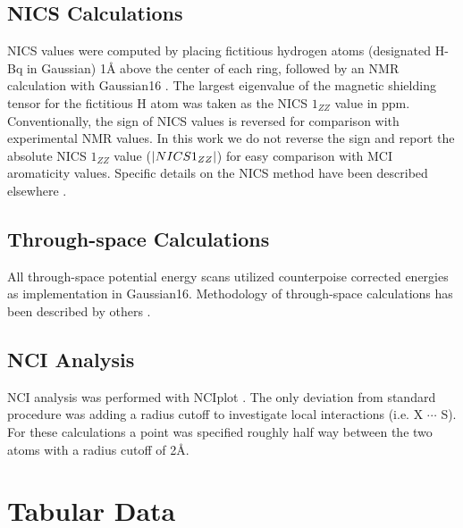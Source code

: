\subsection{NICS Calculations}
NICS values were computed by placing fictitious hydrogen atoms (designated H-Bq in Gaussian) 1\si{\angstrom} above the center of each ring, followed by an NMR calculation with Gaussian16 \cite{g16}. The largest eigenvalue of the magnetic shielding tensor for the fictitious H atom was taken as the NICS $1_{ZZ}$ value in ppm. Conventionally, the sign of NICS values is reversed for comparison with experimental NMR values. In this work we do not reverse the sign and report the absolute NICS $1_{ZZ}$ value ($\abs*{NICS 1_{ZZ}}$) for easy comparison with MCI aromaticity values. Specific details on the NICS method have been described elsewhere \cite{Fallah-Bagher-Shaidaei2006, Chen2005}.

\subsection{Through-space Calculations}
All through-space potential energy scans utilized counterpoise corrected energies as implementation in Gaussian16. Methodology of through-space calculations has been described by others \cite{Jackson2013}.

\subsection{NCI Analysis}
NCI analysis was performed with NCIplot \cite{Johnson2010, Contreras-Garcia2011}. The only deviation from standard procedure was adding a radius cutoff to investigate local interactions (i.e. X $\cdots$ S). For these calculations a point was specified roughly half way between the two atoms with a radius cutoff of 2\AA.

\clearpage
\section{Tabular Data}

